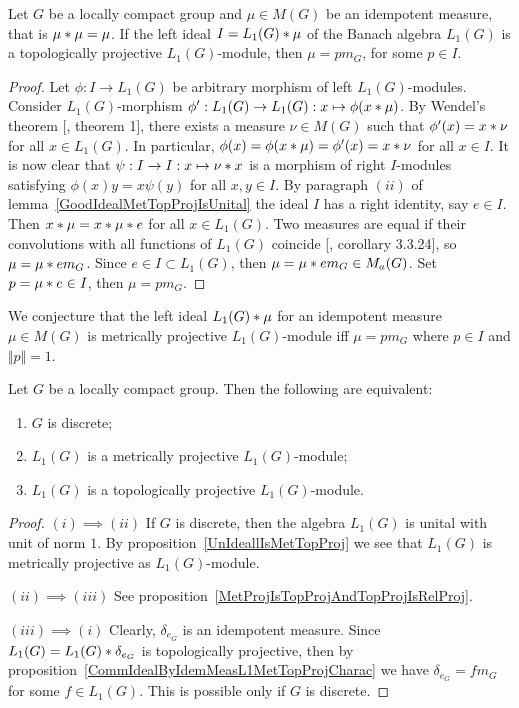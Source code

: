 \begin{proposition}\label{CommIdealByIdemMeasL1MetTopProjCharac} Let $G$ be a
locally compact group and  $\mu\in M(G)$ be an idempotent measure, that is
$\mu\ast\mu=\mu$. If the left ideal $I=L_1(G)\ast\mu$ of the Banach algebra
$L_1(G)$ is a topologically projective $L_1(G)$-module, then $\mu=p m_G$, for some
$p\in I$.
\end{proposition}
\begin{proof} Let $\phi:I\to L_1(G)$ be arbitrary morphism of left
$L_1(G)$-modules. Consider $L_1(G)$-morphism $\phi':L_1(G)\to
L_1(G):x\mapsto\phi(x\ast\mu)$. By Wendel's theorem [\cite{WendLeftCentrzrs},
theorem 1], there exists a measure $\nu\in M(G)$ such that
$\phi'(x)=x\ast\nu$ for all $x\in L_1(G)$. In particular,
$\phi(x)=\phi(x\ast\mu)=\phi'(x)=x\ast\nu$ for all $x\in I$. It is now
clear that $\psi:I\to I:x\mapsto\nu\ast x$ is a morphism of right $I$-modules
satisfying $\phi(x)y=x\psi(y)$ for all $x,y\in I$. By paragraph $(ii)$ of
lemma~\ref{GoodIdealMetTopProjIsUnital} the ideal $I$ has a right identity, say
$e\in I$. Then $x\ast\mu=x\ast\mu\ast e$ for all $x\in L_1(G)$. Two
measures are equal if their convolutions with all functions of $L_1(G)$ coincide
[\cite{DalBanAlgAutCont}, corollary 3.3.24], so $\mu=\mu\ast e m_G$. Since
$e\in I\subset L_1(G)$, then $\mu=\mu\ast e m_G\in M_a(G)$. 
Set $p=\mu\ast e\in I$, then $\mu=p m_G$.
\end{proof}

We conjecture that the left ideal $L_1(G)\ast \mu$ for an idempotent measure
$\mu\in M(G)$ is metrically projective $L_1(G)$-module iff $\mu=p m_G$ where $p\in I$
and $\Vert p\Vert=1$.

\begin{theorem}\label{L1ModL1MetTopProjCharac} Let $G$ be a locally compact
group. Then the following are equivalent:

\begin{enumerate}[label = (\roman*)]
    \item $G$ is discrete;

    \item $L_1(G)$ is a metrically projective $L_1(G)$-module;

    \item $L_1(G)$ is a topologically projective $L_1(G)$-module.
\end{enumerate}
\end{theorem}
\begin{proof} $(i)\implies (ii)$ If $G$ is discrete, then the algebra $L_1(G)$ 
is unital with unit of norm $1$. By  proposition~\ref{UnIdeallIsMetTopProj} 
we see that $L_1(G)$ is metrically projective as $L_1(G)$-module.

$(ii)\implies (iii)$ See
proposition~\ref{MetProjIsTopProjAndTopProjIsRelProj}.

$(iii) \implies (i)$ Clearly, $\delta_{e_G}$ is an idempotent measure. Since
$L_1(G)=L_1(G)\ast \delta_{e_G}$ is topologically projective, then by
proposition~\ref{CommIdealByIdemMeasL1MetTopProjCharac} 
we have $\delta_{e_G}=f m_G$ for some $f\in L_1(G)$. This is possible only 
if $G$ is discrete.
\end{proof}

